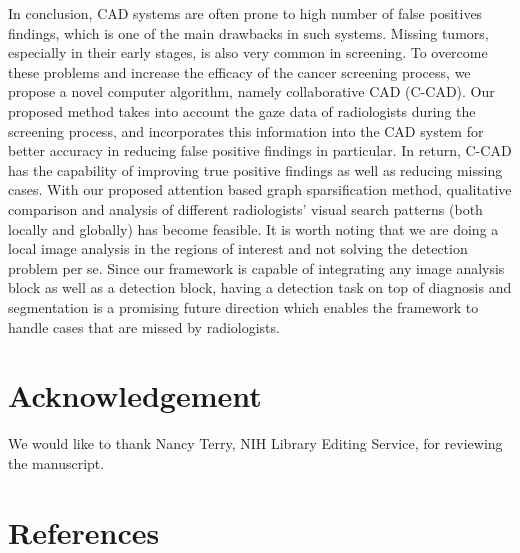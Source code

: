 \documentclass[preprint,12pt]{elsarticle}
\begin{document}


In conclusion, CAD systems are often prone to high number of false positives findings, which is one of the main drawbacks in such systems. Missing tumors, especially in their early stages, is also very common in screening. To overcome these problems and increase the efficacy of the cancer screening process, we propose a novel computer algorithm, namely collaborative CAD (C-CAD). Our proposed method takes into account the gaze data of radiologists during the screening process, and incorporates this information into the CAD system for better accuracy in reducing false positive findings in particular. In return, C-CAD has the capability of improving true positive findings as well as reducing missing cases.%
With our proposed attention based graph sparsification method, qualitative comparison and analysis of different radiologists' visual search patterns (both locally and globally) has become feasible. It is worth noting that we are doing a local image analysis in the regions of interest and not solving the detection problem per se. Since our framework is capable of integrating any image analysis block as well as a detection block, having a detection task on top of diagnosis and segmentation is a promising future direction which enables the framework to handle cases that are missed by radiologists. 


\section*{Acknowledgement }
We would like to thank Nancy Terry, NIH Library Editing Service, for reviewing the manuscript.
\section*{References}

\end{document}
